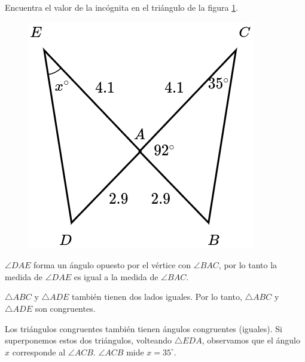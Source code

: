 Encuentra el valor de la incógnita en el triángulo de la figura \ref{fig:angle_triangle_37}.

\begin{minipage}[t][5cm][b]{0.3\textwidth}
    \begin{figure}[H]
        \centering
        \includegraphics[width=0.8\linewidth]{../images/angle_triangle_37.png}
        \caption{}
        \label{fig:angle_triangle_37}
    \end{figure}
\end{minipage}\hfill
\begin{minipage}[t]{0.65\textwidth}
    \begin{solutionbox}{5cm}
        $\angle DAE$ forma un ángulo opuesto por el vértice con $\angle BAC$, por lo tanto la medida de $\angle DAE$ es igual a la medida de $\angle BAC$.

        $\triangle ABC$ y $\triangle ADE$ también tienen dos lados iguales. Por lo tanto,
        $\triangle ABC$ y $\triangle ADE$ son congruentes.

        Los triángulos congruentes también tienen ángulos congruentes (iguales). Si superponemos estos dos triángulos, volteando $\triangle EDA$, observamos que el ángulo $x$ corresponde al $\angle ACB$.
        $\angle ACB$ mide $x=35^\circ$.
    \end{solutionbox}
\end{minipage}

